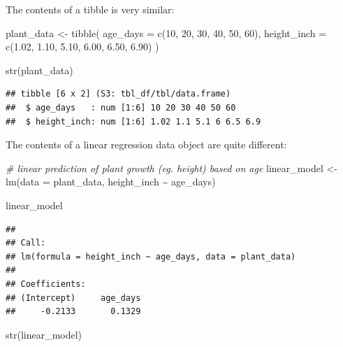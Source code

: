 \documentclass[
]{book}
\newenvironment{Shaded}{\begin{snugshade}}{\end{snugshade}}
\newcommand{\AttributeTok}[1]{\textcolor[rgb]{0.77,0.63,0.00}{#1}}
\newcommand{\CommentTok}[1]{\textcolor[rgb]{0.56,0.35,0.01}{\textit{#1}}}
\newcommand{\DecValTok}[1]{\textcolor[rgb]{0.00,0.00,0.81}{#1}}
\newcommand{\FloatTok}[1]{\textcolor[rgb]{0.00,0.00,0.81}{#1}}
\newcommand{\FunctionTok}[1]{\textcolor[rgb]{0.00,0.00,0.00}{#1}}
\newcommand{\NormalTok}[1]{#1}
\newcommand{\OtherTok}[1]{\textcolor[rgb]{0.56,0.35,0.01}{#1}}
\newcommand{\SpecialCharTok}[1]{\textcolor[rgb]{0.00,0.00,0.00}{#1}}
\begin{document}
The contents of a tibble is very similar:

\begin{Shaded}
\begin{Highlighting}[]
\NormalTok{plant\_data }\OtherTok{\textless{}{-}} \FunctionTok{tibble}\NormalTok{(}
  \AttributeTok{age\_days =} \FunctionTok{c}\NormalTok{(}\DecValTok{10}\NormalTok{, }\DecValTok{20}\NormalTok{, }\DecValTok{30}\NormalTok{, }\DecValTok{40}\NormalTok{, }\DecValTok{50}\NormalTok{, }\DecValTok{60}\NormalTok{),}
  \AttributeTok{height\_inch =} \FunctionTok{c}\NormalTok{(}\FloatTok{1.02}\NormalTok{, }\FloatTok{1.10}\NormalTok{, }\FloatTok{5.10}\NormalTok{, }\FloatTok{6.00}\NormalTok{, }\FloatTok{6.50}\NormalTok{, }\FloatTok{6.90}\NormalTok{)}
\NormalTok{)}

\FunctionTok{str}\NormalTok{(plant\_data)}
\end{Highlighting}
\end{Shaded}

\begin{verbatim}
## tibble [6 x 2] (S3: tbl_df/tbl/data.frame)
##  $ age_days   : num [1:6] 10 20 30 40 50 60
##  $ height_inch: num [1:6] 1.02 1.1 5.1 6 6.5 6.9
\end{verbatim}

The contents of a linear regression data object are quite different:

\begin{Shaded}
\begin{Highlighting}[]
\CommentTok{\# linear prediction of plant growth (eg. height) based on age}
\NormalTok{linear\_model }\OtherTok{\textless{}{-}} \FunctionTok{lm}\NormalTok{(}\AttributeTok{data =}\NormalTok{ plant\_data, height\_inch }\SpecialCharTok{\textasciitilde{}}\NormalTok{ age\_days)}

\NormalTok{linear\_model}
\end{Highlighting}
\end{Shaded}

\begin{verbatim}
## 
## Call:
## lm(formula = height_inch ~ age_days, data = plant_data)
## 
## Coefficients:
## (Intercept)     age_days  
##     -0.2133       0.1329
\end{verbatim}

\begin{Shaded}
\begin{Highlighting}[]
\FunctionTok{str}\NormalTok{(linear\_model)}
\end{Highlighting}
\end{Shaded}
\end{document}
